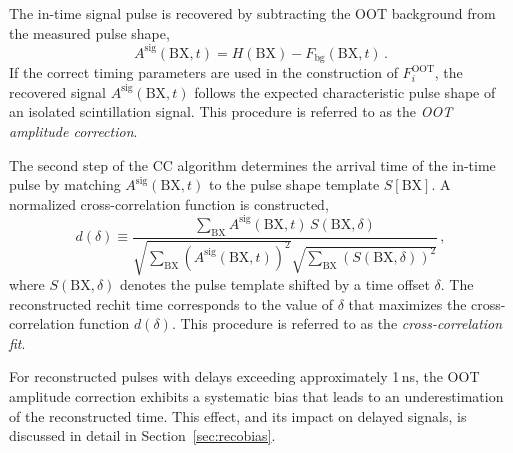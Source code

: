 The in-time signal pulse is recovered by subtracting the OOT background from the measured pulse shape,
\begin{equation}
A^{\mathrm{sig}}(\mathrm{BX},t) =
H(\mathrm{BX}) - F_{\mathrm{bg}}(\mathrm{BX},t) \, .
\label{cc_sig}
\end{equation}
If the correct timing parameters are used in the construction of $F^{\mathrm{OOT}}_{i}$, the recovered signal $A^{\mathrm{sig}}(\mathrm{BX},t)$ follows the expected characteristic pulse shape of an isolated scintillation signal.
This procedure is referred to as the \emph{OOT amplitude correction}.

The second step of the CC algorithm determines the arrival time of the in-time pulse by matching $A^{\mathrm{sig}}(\mathrm{BX},t)$ to the pulse shape template $S[\mathrm{BX}]$.
A normalized cross-correlation function is constructed,
\begin{equation}
d(\delta) \equiv
\frac{\sum_{\mathrm{BX}} A^{\mathrm{sig}}(\mathrm{BX},t)\,S(\mathrm{BX},\delta)}
     {\sqrt{\sum_{\mathrm{BX}} \left(A^{\mathrm{sig}}(\mathrm{BX},t)\right)^{2}}
      \sqrt{\sum_{\mathrm{BX}} \left(S(\mathrm{BX},\delta)\right)^{2}}} \, ,
\label{cc_delta}
\end{equation}
where $S(\mathrm{BX},\delta)$ denotes the pulse template shifted by a time offset $\delta$.
The reconstructed rechit time corresponds to the value of $\delta$ that maximizes the cross-correlation function $d(\delta)$.
This procedure is referred to as the \emph{cross-correlation fit}.

For reconstructed pulses with delays exceeding approximately 1\,ns, the OOT amplitude correction exhibits a systematic bias that leads to an underestimation of the reconstructed time.
This effect, and its impact on delayed signals, is discussed in detail in Section~\ref{sec:recobias}.
